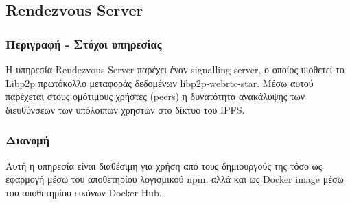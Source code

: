 \subsection{Rendezvous Server} \label{subsection:4-3-7-rendezvous-server-service}

\subsubsection{Περιγραφή - Στόχοι υπηρεσίας}

Η υπηρεσία Rendezvous Server παρέχει έναν signalling server, ο οποίος υιοθετεί το \hyperref[subsection:4-2-4-3-libp2p]{Libp2p} πρωτόκολλο μεταφοράς δεδομένων libp2p-webrtc-star. Μέσω αυτού παρέχεται στους ομότιμους χρήστες (peers) η δυνατότητα ανακάλυψης των διευθύνσεων των υπόλοιπων χρηστών στο δίκτυο του IPFS.

\subsubsection{Διανομή}

Αυτή η υπηρεσία είναι διαθέσιμη για χρήση από τους δημιουργούς της τόσο ως εφαρμογή μέσω του αποθετηρίου λογισμικού npm, αλλά και ως Docker image μέσω του αποθετηρίου εικόνων Docker Hub.